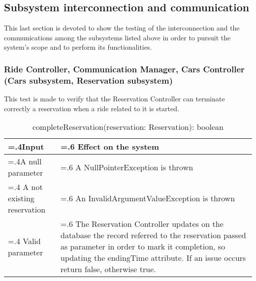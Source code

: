 \documentclass[10pt, a4paper,titlepage]{article}
\begin{document}
\subsection{Subsystem interconnection and communication}
This last section is devoted to show the testing of the interconnection and the communications among the subsystems listed above in order to pursuit the system’s scope and to perform its functionalities.
\subsubsection{Ride Controller, Communication Manager, Cars Controller (Cars subsystem, Reservation subsystem)}
This test is made to verify that the Reservation Controller can terminate correctly a reservation when a ride related to it is started.
\begin{table}[h]
\caption{completeReservation(reservation: Reservation): boolean}
\begin{tabularx}{\textwidth}{|>{\hsize=.4\hsize}X|>{\hsize=.6\hsize}X|}
\hline
Input & Effect on the system\\
\hline
A null parameter & A NullPointerException is thrown\\
\hline
A not existing reservation & An InvalidArgumentValueException is thrown\\
\hline
Valid parameter & The Reservation Controller updates on the database the record referred to the reservation passed as parameter in order to mark it completion, so updating the endingTime attribute. If an issue occurs return false, otherwise true.\\
\hline
\end{tabularx}
\end{table}
\pagebreak
\end{document}
